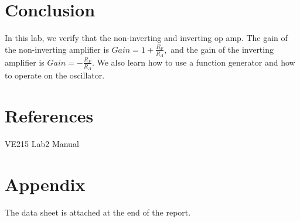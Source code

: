 \documentclass{article}
\begin{document}
\section{Conclusion}
In this lab, we verify that the non-inverting and inverting op amp. The gain of the non-inverting amplifier is $Gain = 1+\frac{R_F}{R_A},$
and the gain of the inverting amplifier is $Gain = -\frac{R_F}{R_A}.$
We also learn how to use a function generator and how to operate on the oscillator.

\section{References}
\noindent [1] VE215 Lab2 Manual

\section{Appendix}
The data sheet is attached at the end of the report.
\end{document}
